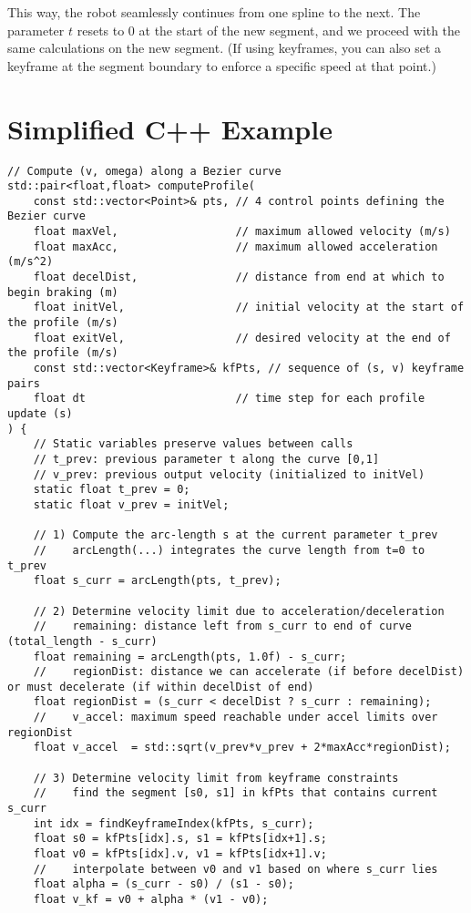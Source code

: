 \documentclass[11pt]{article}
\begin{document}
This way, the robot seamlessly continues from one spline to the next. The parameter $t$ resets to 0 at the start of the new segment, and we proceed with the same calculations on the new segment. (If using keyframes, you can also set a keyframe at the segment boundary to enforce a specific speed at that point.)

\section{Simplified C++ Example}

\begin{lstlisting}
// Compute (v, omega) along a Bezier curve
std::pair<float,float> computeProfile(
    const std::vector<Point>& pts, // 4 control points defining the Bezier curve
    float maxVel,                  // maximum allowed velocity (m/s)
    float maxAcc,                  // maximum allowed acceleration (m/s^2)
    float decelDist,               // distance from end at which to begin braking (m)
    float initVel,                 // initial velocity at the start of the profile (m/s)
    float exitVel,                 // desired velocity at the end of the profile (m/s)
    const std::vector<Keyframe>& kfPts, // sequence of (s, v) keyframe pairs
    float dt                       // time step for each profile update (s)
) {
    // Static variables preserve values between calls
    // t_prev: previous parameter t along the curve [0,1]
    // v_prev: previous output velocity (initialized to initVel)
    static float t_prev = 0;
    static float v_prev = initVel;

    // 1) Compute the arc-length s at the current parameter t_prev
    //    arcLength(...) integrates the curve length from t=0 to t_prev
    float s_curr = arcLength(pts, t_prev);

    // 2) Determine velocity limit due to acceleration/deceleration
    //    remaining: distance left from s_curr to end of curve (total_length - s_curr)
    float remaining = arcLength(pts, 1.0f) - s_curr;
    //    regionDist: distance we can accelerate (if before decelDist) or must decelerate (if within decelDist of end)
    float regionDist = (s_curr < decelDist ? s_curr : remaining);
    //    v_accel: maximum speed reachable under accel limits over regionDist
    float v_accel  = std::sqrt(v_prev*v_prev + 2*maxAcc*regionDist);

    // 3) Determine velocity limit from keyframe constraints
    //    find the segment [s0, s1] in kfPts that contains current s_curr
    int idx = findKeyframeIndex(kfPts, s_curr);
    float s0 = kfPts[idx].s, s1 = kfPts[idx+1].s;
    float v0 = kfPts[idx].v, v1 = kfPts[idx+1].v;
    //    interpolate between v0 and v1 based on where s_curr lies
    float alpha = (s_curr - s0) / (s1 - s0);
    float v_kf = v0 + alpha * (v1 - v0);


\end{lstlisting}
\end{document}
